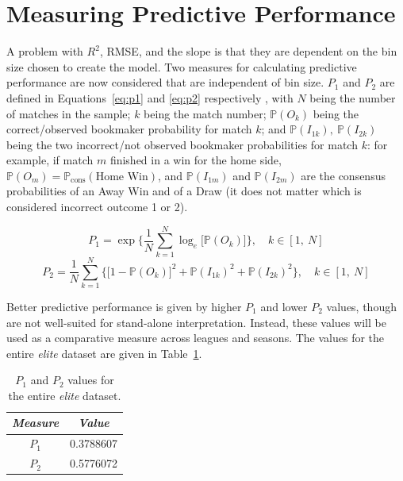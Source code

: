 \documentclass[a4paper,10pt]{report}
\begin{document}
\section{Measuring Predictive Performance}\label{sec:elitepredictiveperformance}
A problem with $R^2$, RMSE, and the slope is that they are dependent on the bin size chosen to create the model. Two measures for calculating predictive performance are now considered that are independent of bin size. $P_1$ and $P_2$ are defined in Equations~\ref{eq:p1} and \ref{eq:p2} respectively \autocite{Owen09}, with $N$ being the number of matches in the sample; $k$ being the match number; $\mathbb{P}(O_k)$ being the correct/observed bookmaker probability for match $k$; and $\mathbb{P}(I_{1k}),\ \mathbb{P}(I_{2k})$ being the two incorrect/not observed bookmaker probabilities for match $k$: for example, if match $m$ finished in a win for the home side, $\mathbb{P}(O_m) = \mathbb{P}_{\textrm{cons}}(\textrm{Home Win})$, and $\mathbb{P}(I_{1m})$ and $\mathbb{P}(I_{2m})$ are the consensus probabilities of an Away Win and of a Draw (it does not matter which is considered incorrect outcome 1 or 2).

\begin{equation}\label{eq:p1}
P_1 = \exp \bigg\{ \frac{1}{N}\sum^N_{k=1} \log_e \big[ \mathbb{P}(O_k) \big] \bigg\}, \quad k\in[1,\ N]
\end{equation}
\begin{equation}\label{eq:p2}
P_2 = \frac{1}{N} \sum^N_{k=1} \bigg\{ \big[1-\mathbb{P}(O_k)\big]^2 + \mathbb{P}(I_{1k})^2 + \mathbb{P}(I_{2k})^2\bigg\}, \quad k\in[1,\ N]
\end{equation}

Better predictive performance is given by higher $P_1$ and lower $P_2$ values, though are not well-suited for stand-alone interpretation. Instead, these values will be used as a comparative measure across leagues and seasons. The values for the entire \textit{elite} dataset are given in Table~\ref{tab:elitep1andp2vals}. 
\begin{table}[h!]\begin{center}\begin{tabular}[h!]{c||c}
			\textit{Measure} & \textit{Value} \\ \hline\hline
			$P_1$ & 0.3788607\\
			$P_2$ & 0.5776072
\end{tabular}\end{center}\caption{$P_1$ and $P_2$ values for the entire \textit{elite} dataset.}\label{tab:elitep1andp2vals}
\end{table}
\end{document}
